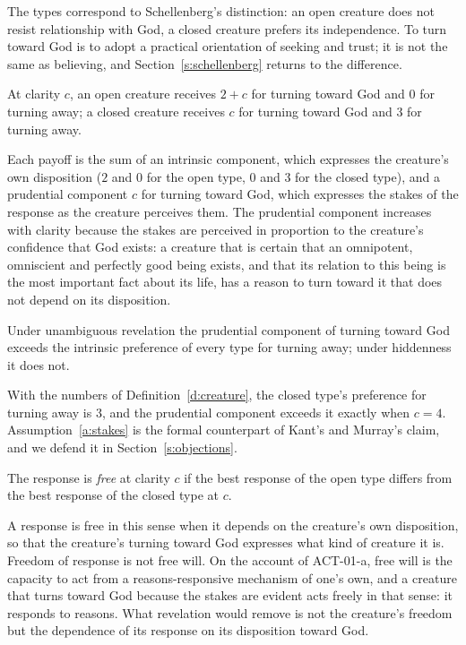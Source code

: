\documentclass{situationist-preprint}
\begin{document}
The types correspond to Schellenberg's distinction: an open creature does not resist relationship with God, a closed creature prefers its independence. To turn toward God is to adopt a practical orientation of seeking and trust; it is not the same as believing, and Section~\ref{s:schellenberg} returns to the difference.

\begin{definition}\label{d:creature}
At clarity $c$, an open creature receives $2 + c$ for turning toward God and $0$ for turning away; a closed creature receives $c$ for turning toward God and $3$ for turning away.
\end{definition}

Each payoff is the sum of an intrinsic component, which expresses the creature's own disposition ($2$ and $0$ for the open type, $0$ and $3$ for the closed type), and a prudential component $c$ for turning toward God, which expresses the stakes of the response as the creature perceives them. The prudential component increases with clarity because the stakes are perceived in proportion to the creature's confidence that God exists: a creature that is certain that an omnipotent, omniscient and perfectly good being exists, and that its relation to this being is the most important fact about its life, has a reason to turn toward it that does not depend on its disposition.

\begin{assumption}[Stakes]\label{a:stakes}
Under unambiguous revelation the prudential component of turning toward God exceeds the intrinsic preference of every type for turning away; under hiddenness it does not.
\end{assumption}

With the numbers of Definition~\ref{d:creature}, the closed type's preference for turning away is $3$, and the prudential component exceeds it exactly when $c = 4$. Assumption~\ref{a:stakes} is the formal counterpart of Kant's and Murray's claim, and we defend it in Section~\ref{s:objections}.

\begin{definition}\label{d:free}
The response is \emph{free} at clarity $c$ if the best response of the open type differs from the best response of the closed type at $c$.
\end{definition}

A response is free in this sense when it depends on the creature's own disposition, so that the creature's turning toward God expresses what kind of creature it is. Freedom of response is not free will. On the account of ACT-01-a, free will is the capacity to act from a reasons-responsive mechanism of one's own, and a creature that turns toward God because the stakes are evident acts freely in that sense: it responds to reasons. What revelation would remove is not the creature's freedom but the dependence of its response on its disposition toward God.
\end{document}
